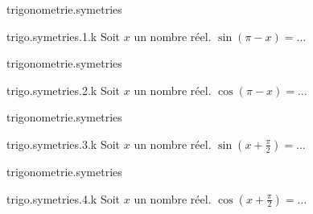 \begin{qcm}{trigonometrie.symetries}
    \begin{question}{trigo.symetries.1.k}
         Soit \(x\) un nombre réel. \(\sin\left(\pi-x\right)=\ldots\)
         \vspace{-1.5ex}
         \begin{multicols}{2}
         \begin{reponses}
         \end{reponses}
        \end{multicols}
    \end{question}
\end{qcm}

\begin{qcm}{trigonometrie.symetries}
    \begin{question}{trigo.symetries.2.k}
         Soit \(x\) un nombre réel. \(\cos\left(\pi-x\right)=\ldots\)
         \vspace{-1.5ex}
         \begin{multicols}{2}
         \begin{reponses}
         \end{reponses}
        \end{multicols}
    \end{question}
\end{qcm}

\begin{qcm}{trigonometrie.symetries}
    \begin{question}{trigo.symetries.3.k}
         Soit \(x\) un nombre réel. \(\sin\left(x+\frac{\pi}{2}\right)=\ldots\)
         \vspace{-1.5ex}
         \begin{multicols}{2}
         \begin{reponses}
         \end{reponses}
        \end{multicols}
    \end{question}
\end{qcm}

\begin{qcm}{trigonometrie.symetries}
    \begin{question}{trigo.symetries.4.k}
         Soit \(x\) un nombre réel. \(\cos\left(x+\frac{\pi}{2}\right)=\ldots\)
         \vspace{-1.5ex}
         \begin{multicols}{2}
         \begin{reponses}
         \end{reponses}
        \end{multicols}
    \end{question}
\end{qcm}
